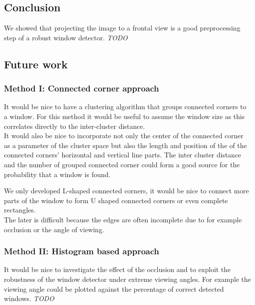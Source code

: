 \subsection{Conclusion}
We showed that projecting the image to a frontal view is a good preprocessing
step of a robust window detector.
\emph{TODO}

\subsection{Future work}
\subsubsection{Method I: Connected corner approach} 
It would be nice to have a clustering algorithm that groups connected corners to
a window. For this method it would be useful to assume the window size as this
correlates directly to the inter-cluster distance.\\

It would also be nice to incorporate not only the center of the connected corner
as a parameter of the cluster space but also the length and position of the of
the connected corners' horizontal and vertical line parts.  The inter cluster
distance and the number of grouped connected corner could form a good source for
the probability that a window is found.

We only developed L-shaped connected corners, it would be nice to connect more
parts of the window to form U shaped connected corners or even complete rectangles.\\
The later is difficult because the edges are often incomplete due to for example occlusion 
or the angle of viewing.


\subsubsection{Method II: Histogram based approach} 
It would be nice to investigate the effect of the occlusion and to exploit the
robustness of the window detector under extreme viewing angles.
For example the viewing angle could be plotted against the percentage of
correct detected windows.
\emph{TODO}


